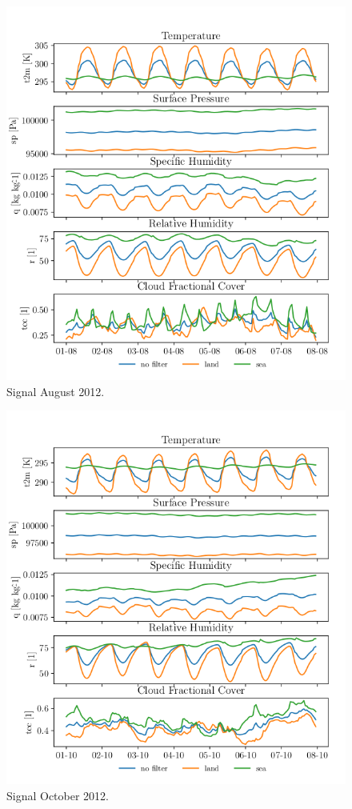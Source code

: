 \begin{figure}[ht]
    \centering
    \includegraphics{python_figs/spatially_averaged_one_week_from_2012-08-01.png}
    \caption{Signal August 2012.}
    \label{fig:aug12}
\end{figure}
\begin{figure}[ht]
    \centering
    \includegraphics{python_figs/spatially_averaged_one_week_from_2012-10-01.png}
    \caption{Signal October 2012.}
    \label{fig:oct12}
\end{figure}
